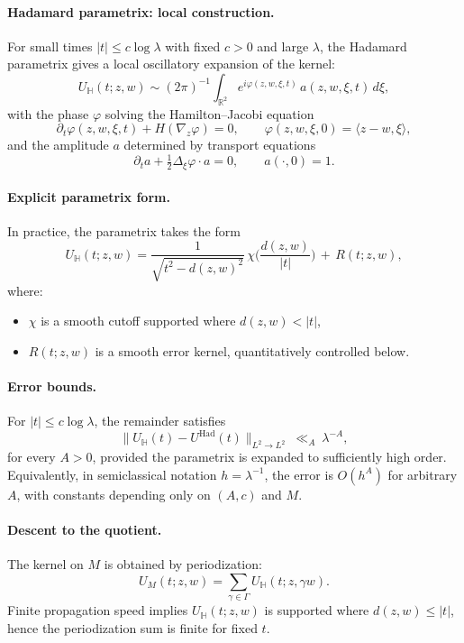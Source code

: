 \paragraph{Hadamard parametrix: local construction.}
For small times $|t|\le c\log \lambda$ with fixed $c>0$ and large $\lambda$,
the Hadamard parametrix gives a local oscillatory expansion of the kernel:
\[
U_{\mathbb{H}}(t; z,w) \sim (2\pi)^{-1}\int_{\mathbb{R}^2}
e^{i \varphi(z,w,\xi,t)}\, a(z,w,\xi,t)\, d\xi,
\]
with the phase $\varphi$ solving the Hamilton--Jacobi equation
\[
\partial_t \varphi(z,w,\xi,t) + H(\nabla_z\varphi) = 0,\qquad
\varphi(z,w,\xi,0) = \langle z-w,\xi\rangle,
\]
and the amplitude $a$ determined by transport equations
\[
\partial_t a + \tfrac12 \Delta_\xi \varphi \cdot a = 0,\qquad a(\cdot,0)=1.
\]

\paragraph{Explicit parametrix form.}
In practice, the parametrix takes the form
\[
U_{\mathbb{H}}(t; z,w) = \frac{1}{\sqrt{t^2-d(z,w)^2}}\,
\chi\!\Big(\frac{d(z,w)}{|t|}\Big)\,+\,R(t;z,w),
\]
where:
\begin{itemize}
  \item $\chi$ is a smooth cutoff supported where $d(z,w)<|t|$,
  \item $R(t;z,w)$ is a smooth error kernel, quantitatively controlled below.
\end{itemize}

\paragraph{Error bounds.}
For $|t|\le c\log \lambda$, the remainder satisfies
\[
\| U_{\mathbb{H}}(t) - U^{\mathrm{Had}}(t)\|_{L^2\to L^2}
\ \ll_A\ \lambda^{-A},
\]
for every $A>0$, provided the parametrix is expanded to sufficiently high order.
Equivalently, in semiclassical notation $h=\lambda^{-1}$, the error is
$O(h^A)$ for arbitrary $A$, with constants depending only on $(A,c)$ and $M$.

\paragraph{Descent to the quotient.}
The kernel on $M$ is obtained by periodization:
\[
U_M(t; z,w) = \sum_{\gamma \in \Gamma} U_{\mathbb{H}}(t; z,\gamma w).
\]
Finite propagation speed implies $U_{\mathbb{H}}(t; z,w)$ is supported where
$d(z,w)\le |t|$, hence the periodization sum is finite for fixed $t$.

